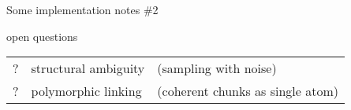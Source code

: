 \documentclass{beamer}
\begin{document}
\begin{frame}{Some implementation notes \#2}
	\small

	\begin{block}{open questions}
		\begin{tabularx}{0.99\textwidth}{@{}lll@{}}
			? & structural ambiguity			& (sampling with noise)\\
			? & polymorphic linking			& (coherent chunks as single atom)
		\end{tabularx}
	\end{block}
\end{frame}
\end{document}
